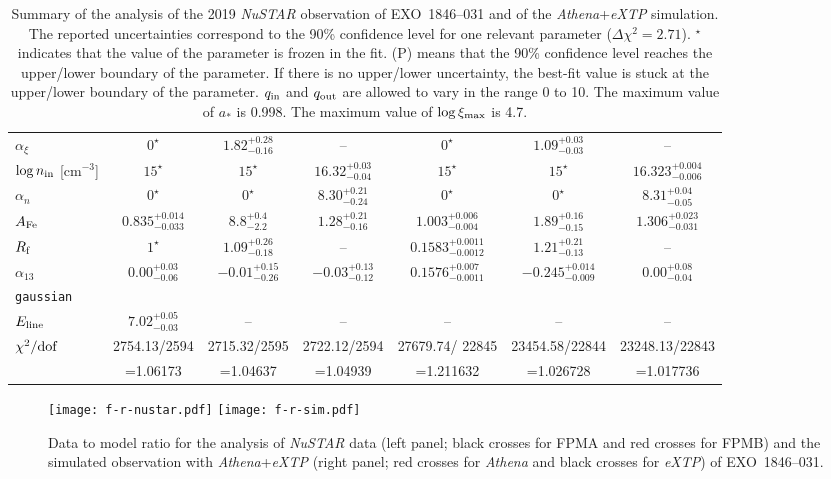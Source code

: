 \documentclass[twocolumn]{emulateapj}
\begin{document}
\begin{table*}
{\begin{tabular}{lccc|ccc}
$\alpha_\xi$ & $0^\star$ & $1.82_{-0.16}^{+0.28}$ & -- & $0^\star$ & $1.09_{-0.03}^{+0.03}$ & -- \\
$\log n_{\rm in}$ [cm$^{-3}$] & $15^\star$ & $15^\star$ & $16.32_{-0.04}^{+0.03}$ & $15^\star$ & $15^\star$ & $16.323_{-0.006}^{+0.004}$ \\
$\alpha_n$ & $0^\star$ & $0^\star$ & $8.30_{-0.24}^{+0.21}$ & $0^\star$ & $0^\star$ & $8.31_{-0.05}^{+0.04}$ \\
$A_{\rm Fe}$ & $0.835_{-0.033}^{+0.014}$ & $8.8_{-2.2}^{+0.4}$ & $1.28_{-0.16}^{+0.21}$ & $1.003_{-0.004}^{+0.006}$ & $1.89_{-0.15}^{+0.16}$ & $1.306_{-0.031}^{+0.023}$ \\
$R_{\rm f}$ & $1^\star$ & $1.09_{-0.18}^{+0.26}$ & -- & $0.1583_{-0.0012}^{+0.0011}$ & $1.21_{-0.13}^{+0.21}$ & -- \\
$\alpha_{13}$ & $0.00_{-0.06}^{+0.03}$ & $-0.01_{-0.26}^{+0.15}$ & $-0.03_{-0.12}^{+0.13}$ & $0.1576_{-0.0011}^{+0.007}$ & $-0.245_{-0.009}^{+0.014}$ & $0.00_{-0.04}^{+0.08}$ \\
\hline
{\tt gaussian} \\
$E_{\rm line}$ & $7.02_{-0.03}^{+0.05}$ & -- & -- & -- & -- & -- \\
\hline
$\chi^2/{\rm dof}$ & 2754.13/2594 & 2715.32/2595 & 2722.12/2594 & 27679.74/ 22845 & 23454.58/22844 & 23248.13/22843 \\
& =1.06173 & =1.04637 & =1.04939 & =1.211632 & =1.026728 & =1.017736 \\ 
\hline\hline
\end{tabular}
}
\caption{\rm Summary of the analysis of the 2019 \textsl{NuSTAR} observation of EXO~1846--031 and of the \textsl{Athena}+\textsl{eXTP} simulation. The reported uncertainties correspond to the 90\% confidence level for one relevant parameter ($\Delta\chi^2 = 2.71$). $^\star$ indicates that the value of the parameter is frozen in the fit. (P) means that the 90\% confidence level reaches the upper/lower boundary of the parameter. If there is no upper/lower uncertainty, the best-fit value is stuck at the upper/lower boundary of the parameter. $q_{\rm in}$ and $q_{\rm out}$ are allowed to vary in the range 0 to 10. The maximum value of $a_*$ is 0.998. The maximum value of $\log\xi_{\rm max}$ is 4.7. \label{t-nustar}}
\end{table*}





\begin{figure*}
\begin{center}
\texttt{[image: f-r-nustar.pdf]}
\hspace{0.8cm}
\texttt{[image: f-r-sim.pdf]}
\end{center}
\vspace{-0.3cm}
\caption{Data to model ratio for the analysis of \textsl{NuSTAR} data (left panel; black crosses for FPMA and red crosses for FPMB) and the simulated observation with \textsl{Athena}+\textsl{eXTP} (right panel; red crosses for \textsl{Athena} and black crosses for \textsl{eXTP}) of EXO~1846--031.}
\label{ratio}
\end{figure*}
\end{document}
